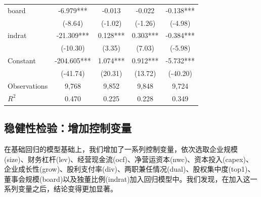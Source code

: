 \documentclass{article}
\begin{document}
\begin{table}[H]
\begin{tabular}{@{}lcccc@{}}
    board        & -6.979***   & -0.013    & -0.022    & -0.138*** \\
                 & (-8.64)     & (-1.02)   & (-1.26)   & (-4.98)   \\
    indrat       & -21.309***  & 0.128***  & 0.303***  & -0.384*** \\
                 & (-10.30)    & (3.35)    & (7.03)    & (-5.98)   \\
    Constant     & -204.605*** & 1.074***  & 0.912***  & -5.732*** \\
                 & (-41.74)    & (20.31)   & (13.72)   & (-40.20)  \\
    Observations & 9,768       & 9,852     & 9,848     & 9,724     \\
    $R^2$    & 0.470       & 0.225     & 0.228     & 0.349     \\ \bottomrule
    \end{tabular}
    \end{table}

\subsection{稳健性检验：增加控制变量}
在基础回归的模型基础上，我们增加了一系列控制变量，依次选取企业规模(size)、财务杠杆(lev)、经营现金流(ocf)、净营运资本(nwc)、资本投入(capex)、企业成长性(grow)、股利支付率(div)、两职兼任情况(dual)、股权集中度(top1)、董事会规模(board)以及独董比例(indrat)加入回归模型中。我们发现，在加入这一系列变量之后，结论变得更加显著。
\end{document}
